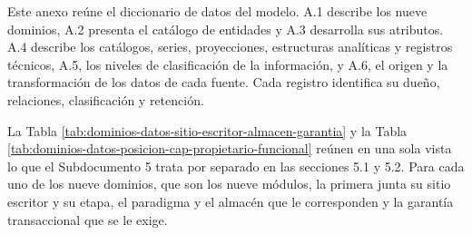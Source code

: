 \documentclass[anexo]{../../comun/overfore}
\begin{document}
Este anexo reúne el diccionario de datos del modelo. A.1 describe los nueve dominios, A.2 presenta el catálogo de entidades y A.3 desarrolla sus atributos. A.4 describe los catálogos, series, proyecciones, estructuras analíticas y registros técnicos, A.5, los niveles de clasificación de la información, y A.6, el origen y la transformación de los datos de cada fuente. Cada registro identifica su dueño, relaciones, clasificación y retención.

La Tabla \ref{tab:dominios-datos-sitio-escritor-almacen-garantia} y la Tabla \ref{tab:dominios-datos-posicion-cap-propietario-funcional} reúnen en una sola vista lo que el Subdocumento 5 trata por separado en las secciones 5.1 y 5.2. Para cada uno de los nueve dominios, que son los nueve módulos, la primera junta su sitio escritor y su etapa, el paradigma y el almacén que le corresponden y la garantía transaccional que se le exige.
\end{document}

